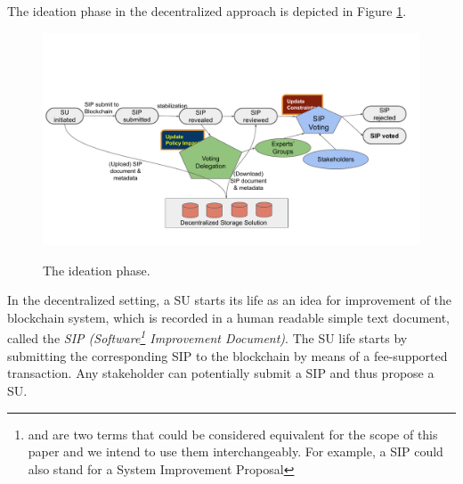 
The ideation phase in the decentralized approach is depicted in Figure \ref{ideation}.
\begin{figure}[h!] %
    \caption{The ideation phase.}
    \centering
    \includegraphics[width=1.0 \columnwidth,keepaspectratio]{figures/ideation_phase.pdf}
    \label{ideation}
\end{figure}
In the decentralized setting, a SU starts its life as an idea for improvement of the blockchain system, which is recorded in a human readable simple text document, called the \emph{SIP (Software\footnote{ and  are two terms that could be considered equivalent for the scope of this paper and we intend to use them interchangeably. For example, a SIP could also stand for a System Improvement Proposal} Improvement Document)}. The SU life starts by submitting the corresponding SIP to the blockchain by means of a fee-supported
 transaction. Any stakeholder can potentially submit a SIP and thus propose a SU. 

